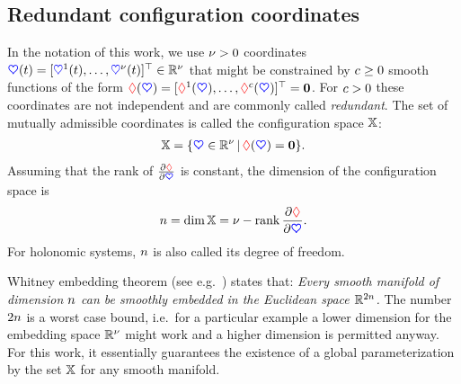 \subsection{Redundant configuration coordinates}
In the notation of this work, we use $\numCoord > 0$ coordinates $\sysCoord(t) = [\sysCoordCoeff{1}(t),\ldots,\sysCoordCoeff{\numCoord}(t)]^\top \in \RealNum^\numCoord$ that might be constrained by $\numGeoConst \geq 0$ smooth functions of the form $\geoConstraint(\sysCoord) = [\geoConstraintCoeff{1}(\sysCoord), \ldots, \geoConstraintCoeff{\numGeoConst}(\sysCoord)]^\top = \tuple{0}$.
For $\numGeoConst > 0$ these coordinates are not independent and are commonly called \textit{redundant}.
The set of mutually admissible coordinates is called the configuration space $\configSpace$:
\begin{align}
 \configSpace = \{ \sysCoord \in \RealNum^{\numCoord} \, | \, \geoConstraint(\sysCoord) = \tuple{0} \}.
\end{align}
Assuming that the rank of $\pdiff[\geoConstraint]{\sysCoord}$ is constant, the dimension of the configuration space is
\begin{align}
 \dimConfigSpace = \dim \configSpace = \numCoord - \rank \pdiff[\geoConstraint]{\sysCoord}.
\end{align}For holonomic systems, $\dimConfigSpace$ is also called its degree of freedom.

Whitney embedding theorem (see e.g.\ \cite[Theo.\,6.14]{Lee:SmoothManifolds}) states that: \textit{Every smooth manifold of dimension $\dimConfigSpace$ can be smoothly embedded in the Euclidean space $\RealNum^{2\dimConfigSpace}$.}
The number $2\dimConfigSpace$ is a worst case bound, i.e.\ for a particular example a lower dimension for the embedding space $\RealNum^\numCoord$ might work and a higher dimension is permitted anyway.
For this work, it essentially guarantees the existence of a global parameterization by the set $\configSpace$ for any smooth manifold.


